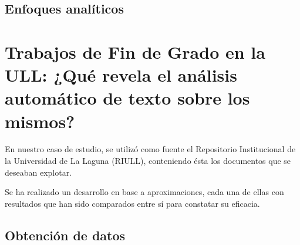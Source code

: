 

\subsection{Enfoques analíticos}



\section{Trabajos de Fin de Grado en la ULL: ¿Qué revela el análisis automático de texto sobre los mismos?}
En nuestro caso de estudio, se utilizó como fuente el Repositorio Institucional de la Universidad de La Laguna (RIULL), conteniendo ésta los documentos que se deseaban explotar.




Se ha realizado un desarrollo en base a aproximaciones, cada una de ellas con resultados que han sido comparados entre sí para constatar su eficacia.

\subsection{Obtención de datos}




